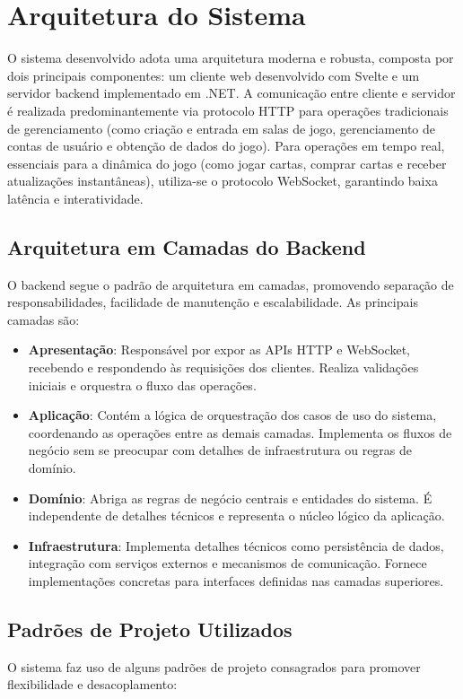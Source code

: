 \chapter{Arquitetura do Sistema}

O sistema desenvolvido adota uma arquitetura moderna e robusta, composta por dois principais componentes: um cliente web desenvolvido com Svelte e um servidor backend implementado em .NET. A comunicação entre cliente e servidor é realizada predominantemente via protocolo HTTP para operações tradicionais de gerenciamento (como criação e entrada em salas de jogo, gerenciamento de contas de usuário e obtenção de dados do jogo). Para operações em tempo real, essenciais para a dinâmica do jogo (como jogar cartas, comprar cartas e receber atualizações instantâneas), utiliza-se o protocolo WebSocket, garantindo baixa latência e interatividade.

\section{Arquitetura em Camadas do Backend}
O backend segue o padrão de arquitetura em camadas, promovendo separação de responsabilidades, facilidade de manutenção e escalabilidade. As principais camadas são:

\begin{itemize}
    \item \textbf{Apresentação}: Responsável por expor as APIs HTTP e WebSocket, recebendo e respondendo às requisições dos clientes. Realiza validações iniciais e orquestra o fluxo das operações.
    \item \textbf{Aplicação}: Contém a lógica de orquestração dos casos de uso do sistema, coordenando as operações entre as demais camadas. Implementa os fluxos de negócio sem se preocupar com detalhes de infraestrutura ou regras de domínio.
    \item \textbf{Domínio}: Abriga as regras de negócio centrais e entidades do sistema. É independente de detalhes técnicos e representa o núcleo lógico da aplicação.
    \item \textbf{Infraestrutura}: Implementa detalhes técnicos como persistência de dados, integração com serviços externos e mecanismos de comunicação. Fornece implementações concretas para interfaces definidas nas camadas superiores.
\end{itemize}

\section{Padrões de Projeto Utilizados}
O sistema faz uso de alguns padrões de projeto consagrados para promover flexibilidade e desacoplamento:

